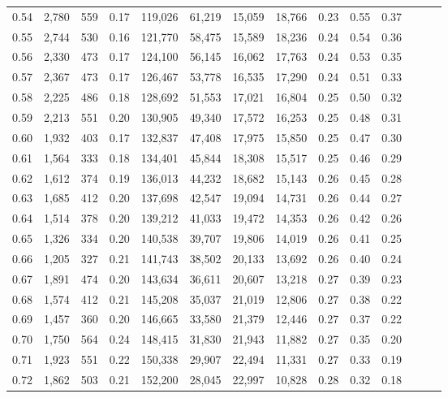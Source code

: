 \begin{tabular}{rrrrrrrrrrrrrr}
0.54 &  2,780 &  559 &  0.17 &  119,026 &   61,219 &  15,059 &  18,766 &  0.23 &  0.55 &      0.37 \\
0.55 &  2,744 &  530 &  0.16 &  121,770 &   58,475 &  15,589 &  18,236 &  0.24 &  0.54 &      0.36 \\
0.56 &  2,330 &  473 &  0.17 &  124,100 &   56,145 &  16,062 &  17,763 &  0.24 &  0.53 &      0.35 \\
0.57 &  2,367 &  473 &  0.17 &  126,467 &   53,778 &  16,535 &  17,290 &  0.24 &  0.51 &      0.33 \\
0.58 &  2,225 &  486 &  0.18 &  128,692 &   51,553 &  17,021 &  16,804 &  0.25 &  0.50 &      0.32 \\
0.59 &  2,213 &  551 &  0.20 &  130,905 &   49,340 &  17,572 &  16,253 &  0.25 &  0.48 &      0.31 \\
0.60 &  1,932 &  403 &  0.17 &  132,837 &   47,408 &  17,975 &  15,850 &  0.25 &  0.47 &      0.30 \\
0.61 &  1,564 &  333 &  0.18 &  134,401 &   45,844 &  18,308 &  15,517 &  0.25 &  0.46 &      0.29 \\
0.62 &  1,612 &  374 &  0.19 &  136,013 &   44,232 &  18,682 &  15,143 &  0.26 &  0.45 &      0.28 \\
0.63 &  1,685 &  412 &  0.20 &  137,698 &   42,547 &  19,094 &  14,731 &  0.26 &  0.44 &      0.27 \\
0.64 &  1,514 &  378 &  0.20 &  139,212 &   41,033 &  19,472 &  14,353 &  0.26 &  0.42 &      0.26 \\
0.65 &  1,326 &  334 &  0.20 &  140,538 &   39,707 &  19,806 &  14,019 &  0.26 &  0.41 &      0.25 \\
0.66 &  1,205 &  327 &  0.21 &  141,743 &   38,502 &  20,133 &  13,692 &  0.26 &  0.40 &      0.24 \\
0.67 &  1,891 &  474 &  0.20 &  143,634 &   36,611 &  20,607 &  13,218 &  0.27 &  0.39 &      0.23 \\
0.68 &  1,574 &  412 &  0.21 &  145,208 &   35,037 &  21,019 &  12,806 &  0.27 &  0.38 &      0.22 \\
0.69 &  1,457 &  360 &  0.20 &  146,665 &   33,580 &  21,379 &  12,446 &  0.27 &  0.37 &      0.22 \\
0.70 &  1,750 &  564 &  0.24 &  148,415 &   31,830 &  21,943 &  11,882 &  0.27 &  0.35 &      0.20 \\
0.71 &  1,923 &  551 &  0.22 &  150,338 &   29,907 &  22,494 &  11,331 &  0.27 &  0.33 &      0.19 \\
0.72 &  1,862 &  503 &  0.21 &  152,200 &   28,045 &  22,997 &  10,828 &  0.28 &  0.32 &      0.18 \\

\end{tabular}
